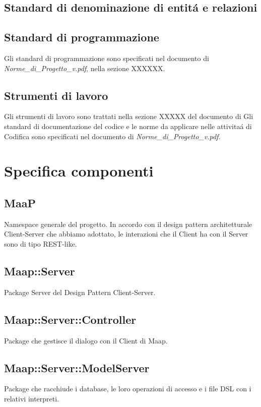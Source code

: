 \subsection{Standard di denominazione di entit\'{a} e relazioni}

\subsection{Standard di programmazione}
Gli standard di programmazione sono specificati nel documento di 
\emph{Norme\_{}di\_{}Progetto\_{}v\versioneNormeDiProgetto{}.pdf}, nella sezione XXXXXX.	%

\subsection{Strumenti di lavoro}
Gli strumenti di lavoro sono trattati nella sezione XXXXX del documento di					%
Gli standard di documentazione del codice e le norme da applicare nelle attivita\'{a} 
di Codifica sono specificati nel documento di 
\emph{Norme\_{}di\_{}Progetto\_{}v\versioneNormeDiProgetto{}.pdf}.

\newpage
\section{Specifica componenti}

\subsection{MaaP}
Namespace generale del progetto. In accordo con il design pattern architetturale Client-Server che 
abbiamo adottato, le interazioni che il Client ha con il Server sono di tipo REST-like.

\subsection{Maap::Server}
Package Server del Design Pattern Client-Server. 

\subsection{Maap::Server::Controller}
Package che gestisce il dialogo con il Client di Maap. 

\subsection{Maap::Server::ModelServer}
Package che racchiude i database, le loro operazioni di accesso e i file 
DSL con i relativi interpreti.

